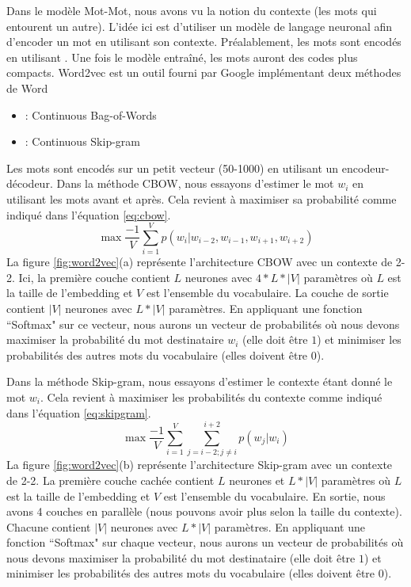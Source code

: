 \documentclass{KodeBook}
\begin{document}
Dans le modèle Mot-Mot, nous avons vu la notion du contexte (les mots qui entourent un autre). 
L'idée ici est d'utiliser un modèle de langage neuronal afin d'encoder un mot en utilisant son contexte. 
Préalablement, les mots sont encodés en utilisant .
Une fois le modèle entraîné, les mots auront des codes plus compacts. 
Word2vec est un outil fourni par Google implémentant deux méthodes de Word  \cite{2013-mikolov-al}
\begin{itemize}
	\item {} : Continuous Bag-of-Words
	\item {} : Continuous Skip-gram
\end{itemize}

Les mots sont encodés sur un petit vecteur (50-1000) en utilisant un encodeur-décodeur. 
Dans la méthode CBOW, nous essayons d'estimer le mot $w_i$ en utilisant les mots avant et après. 
Cela revient à maximiser sa probabilité comme indiqué dans l'équation \ref{eq:cbow}.
\begin{equation}
\max \frac{-1}{V} \sum_{i=1}^{V} p(w_i |w_{i-2}, w_{i-1}, w_{i+1}, w_{i+2})
\label{eq:cbow}
\end{equation}
La figure \ref{fig:word2vec}(a) représente l'architecture CBOW avec un contexte de 2-2. 
Ici, la première couche contient $L$ neurones avec $4 * L * |V|$ paramètres où $L$ est la taille de l'embedding et $V$ est l'ensemble du vocabulaire. 
La couche de sortie contient $|V|$ neurones avec $L * |V|$ paramètres.
En appliquant une fonction ``Softmax" sur ce vecteur, nous aurons un vecteur de probabilités où nous devons maximiser la probabilité du mot destinataire $w_i$ (elle doit être $1$) et minimiser les probabilités des autres mots du vocabulaire (elles doivent être $0$). 

Dans la méthode Skip-gram, nous essayons d'estimer le contexte étant donné le mot $w_i$. 
Cela revient à maximiser les probabilités du contexte comme indiqué dans l'équation \ref{eq:skipgram}. 
\begin{equation}
\max \frac{-1}{V} \sum_{i=1}^{V} \sum_{j= i-2; j \ne i}^{i+2} p(w_j |w_i)
\label{eq:skipgram}
\end{equation}
La figure \ref{fig:word2vec}(b) représente l'architecture Skip-gram avec un contexte de 2-2. 
La première couche cachée contient $L$ neurones et $L * |V|$ paramètres où $L$ est la taille de l'embedding et $V$ est l'ensemble du vocabulaire. 
En sortie, nous avons 4 couches en parallèle (nous pouvons avoir plus selon la taille du contexte). 
Chacune contient $|V|$ neurones avec $L * |V|$ paramètres.
En appliquant une fonction ``Softmax" sur chaque vecteur, nous aurons un vecteur de probabilités où nous devons maximiser la probabilité du mot destinataire (elle doit être $1$) et minimiser les probabilités des autres mots du vocabulaire (elles doivent être $0$). 
\end{document}
